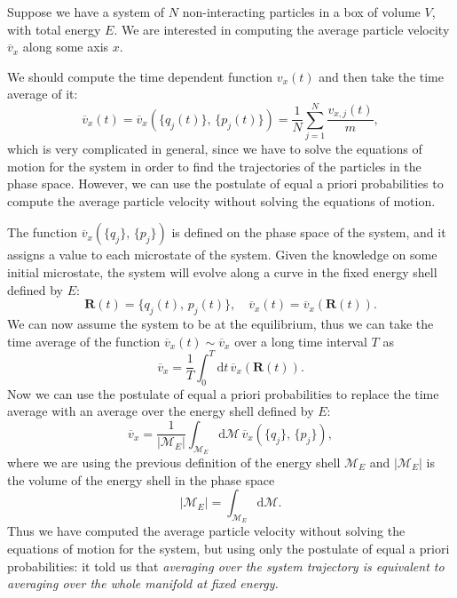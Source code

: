 \begin{example}
    Suppose we have a system of \(N\) non-interacting particles in a box of volume \(V\), with total energy \(E\). We are interested in computing the average particle velocity \(\overline{v}_x\) along some axis \(x\).

    We should compute the time dependent function \(v_x(t)\) and then take the time average of it:
    \[
        \overline{v}_x (t) = \overline{v}_x(\{q_j(t)\},\,\{p_j(t)\}) = \frac{1}{N} \sum_{j=1}^N \frac{v_{x,j}(t)}{m},
    \]
    which is very complicated in general, since we have to solve the equations of motion for the system in order to find the trajectories of the particles in the phase space. However, we can use the postulate of equal a priori probabilities to compute the average particle velocity without solving the equations of motion.

    The function \(\overline{v}_x(\{q_j\},\,\{p_j\})\) is defined on the phase space of the system, and it assigns a value to each microstate of the system. Given the knowledge on some initial microstate, the system will evolve along a curve in the fixed energy shell defined by \(E\):
    \[
        \mathbf{R}(t) = \{q_j(t),\, p_j(t)\}, \quad \overline{v}_x(t) = \overline{v}_x(\mathbf{R}(t)).
    \]
    We can now assume the system to be at the equilibrium, thus we can take the time average of the function \(\overline{v}_x(t) \sim \overline{v}_x\) over a long time interval \(T\) as
    \[
        \overline{v}_x = \frac{1}{T} \int_0^T \mathrm{d}t \, \overline{v}_x(\mathbf{R}(t)).
    \]
    Now we can use the postulate of equal a priori probabilities to replace the time average with an average over the energy shell defined by \(E\):
    \[
        \overline{v}_x = \frac{1}{| \mathcal{M}_E |} \int_{\mathcal{M}_E} \mathrm{d} \mathcal{M} \, \overline{v}_x(\{q_j\},\,\{p_j\}),
    \]
    where we are using the previous definition of the energy shell \(\mathcal{M}_E\) and \(|\mathcal{M}_E|\) is the volume of the energy shell in the phase space
    \[
        | \mathcal{M}_E | = \int_{\mathcal{M}_E} \mathrm{d} \mathcal{M}.
    \]
    Thus we have computed the average particle velocity without solving the equations of motion for the system, but using only the postulate of equal a priori probabilities: it told us that \textit{averaging over the system trajectory is equivalent to averaging over the whole manifold at fixed energy.}
\end{example}


